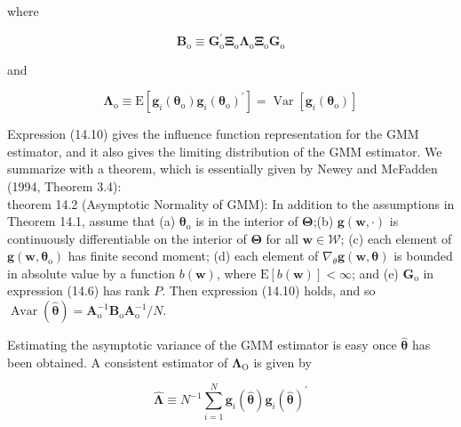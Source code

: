 \documentclass[10pt]{article}
\begin{document}
where


\begin{equation*}
\mathbf{B}_{\mathrm{o}} \equiv \mathbf{G}_{\mathrm{o}}^{\prime} \boldsymbol{\Xi}_{\mathrm{o}} \boldsymbol{\Lambda}_{\mathrm{o}} \boldsymbol{\Xi}_{\mathrm{o}} \mathbf{G}_{\mathrm{o}} \tag{14.11}
\end{equation*}


and


\begin{equation*}
\boldsymbol{\Lambda}_{\mathrm{o}} \equiv \mathrm{E}\left[\mathbf{g}_{i}\left(\boldsymbol{\theta}_{\mathrm{o}}\right) \mathbf{g}_{i}\left(\boldsymbol{\theta}_{\mathrm{o}}\right)^{\prime}\right]=\operatorname{Var}\left[\mathbf{g}_{i}\left(\boldsymbol{\theta}_{\mathrm{o}}\right)\right] \tag{14.12}
\end{equation*}


Expression (14.10) gives the influence function representation for the GMM estimator, and it also gives the limiting distribution of the GMM estimator. We summarize with a theorem, which is essentially given by Newey and McFadden (1994, Theorem 3.4):\\
theorem 14.2 (Asymptotic Normality of GMM): In addition to the assumptions in Theorem 14.1, assume that (a) $\boldsymbol{\theta}_{\mathrm{o}}$ is in the interior of $\boldsymbol{\Theta}$;(b) $\mathbf{g}(\mathbf{w}, \cdot)$ is continuously differentiable on the interior of $\boldsymbol{\Theta}$ for all $\mathbf{w} \in \mathscr{W}$; (c) each element of $\mathbf{g}\left(\mathbf{w}, \boldsymbol{\theta}_{\mathrm{o}}\right)$ has finite second moment; (d) each element of $\nabla_{\theta} \mathbf{g}(\mathbf{w}, \boldsymbol{\theta})$ is bounded in absolute value by a function $b(\mathbf{w})$, where $\mathrm{E}[b(\mathbf{w})]<\infty$; and (e) $\mathbf{G}_{\mathrm{o}}$ in expression (14.6) has rank $P$. Then expression (14.10) holds, and so $\operatorname{Avar}(\hat{\boldsymbol{\theta}})=\mathbf{A}_{\mathrm{o}}^{-1} \mathbf{B}_{\mathrm{o}} \mathbf{A}_{\mathrm{o}}^{-1} / N$.

Estimating the asymptotic variance of the GMM estimator is easy once $\hat{\boldsymbol{\theta}}$ has been obtained. A consistent estimator of $\boldsymbol{\Lambda}_{\mathrm{O}}$ is given by


\begin{equation*}
\hat{\boldsymbol{\Lambda}} \equiv N^{-1} \sum_{i=1}^{N} \mathbf{g}_{i}(\hat{\boldsymbol{\theta}}) \mathbf{g}_{i}(\hat{\boldsymbol{\theta}})^{\prime} \tag{14.13}
\end{equation*}
\end{document}
